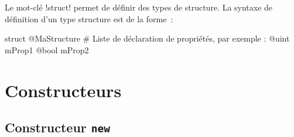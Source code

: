 


Le mot-clé \ggs!struct! permet de définir des types de structure. La syntaxe de définition d'un type structure est de la forme~:

\begin{galgas}
struct @MaStructure {
  # Liste de déclaration de propriétés, par exemple :
  @uint mProp1
  @bool mProp2
}
\end{galgas}


%
%
%
%
%













\section{Constructeurs}

\subsection{Constructeur \texttt{new}}

